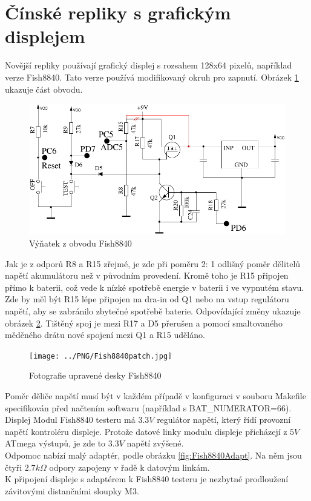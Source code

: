 \section{Čínské repliky s grafickým displejem}
Novější repliky používají grafický displej s rozsahem 128x64 pixelů, například verze Fish8840.
Tato verze používá modifikovaný okruh pro zapnutí. Obrázek \ref{fig:Fish8840} ukazuje část obvodu.

\begin{figure}[H]
\centering
\includegraphics[width=12cm]{../FIG/Fish8840.pdf}
\caption{Výňatek z obvodu Fish8840}
\label{fig:Fish8840}
\end{figure}

Jak je z odporů R8 a R15 zřejmé, je zde při poměru 2: 1 odlišný poměr dělitelů napětí akumulátoru
než v původním provedení.
Kromě toho je R15 připojen přímo k baterii, což vede k nízké spotřebě energie v baterii
i ve vypnutém stavu. Zde by měl být R15 lépe připojen na dra-in od Q1 nebo na vstup regulátoru napětí, aby
se zabránilo zbytečné spotřebě baterie.
Odpovídající změny ukazuje obrázek \ref{fig:Fish8840patch}. Tištěný spoj je mezi  R17 a D5 přerušen
a pomocí smaltovaného měděného drátu nové spojení mezi Q1 a R15 uděláno.

\begin{figure}[H]
\centering
\texttt{[image: ../PNG/Fish8840patch.jpg]}
\caption{Fotografie upravené desky Fish8840}
\label{fig:Fish8840patch}
\end{figure}

Poměr děliče napětí musí být v každém případě v konfiguraci v souboru Makefile specifikován 
před načtením softwaru (například s BAT\_NUMERATOR=66).\\
Displej Modul Fish8840 testeru má \(3.3V\) regulátor napětí, který řídí provozní napětí kontroléru
displeje.
Protože datové linky modulu displeje přicházejí z \(5V\) ATmega výstupů, je zde to \(3.3V\) napětí
zvýšené.\\
Odpomoc nabízí malý adaptér, podle obrázku \ref{fig:Fish8840Adapt}. Na něm jsou čtyři \(2.7k\Omega\)
odpory zapojeny v řadě k datovým linkám.\\
K připojení displeje s adaptérem k Fish8840 testeru je nezbytné prodloužení závitovými distančními sloupky M3.\\

